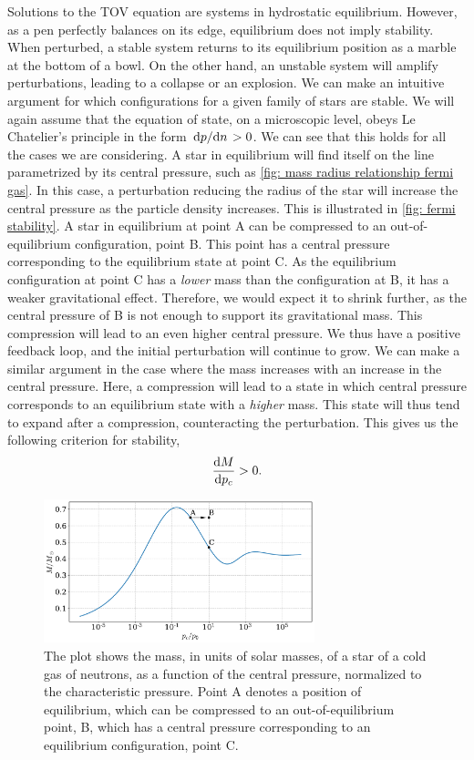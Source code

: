 Solutions to the TOV equation are systems in hydrostatic equilibrium.
However, as a pen perfectly balances on its edge, equilibrium does not imply stability.
When perturbed, a stable system returns to its equilibrium position as a marble at the bottom of a bowl.
On the other hand, an unstable system will amplify perturbations, leading to a collapse or an explosion.
We can make an intuitive argument for which configurations for a given family of stars are stable.
We will again assume that the equation of state, on a microscopic level, obeys Le Chatelier's principle in the form $\odv{p}/{n} > 0$.
We can see that this holds for all the cases we are considering.
A star in equilibrium will find itself on the line parametrized by its central pressure, such as \autoref{fig: mass radius relationship fermi gas}.
In this case, a perturbation reducing the radius of the star will increase the central pressure as the particle density increases.
This is illustrated in \autoref{fig: fermi stability}.
A star in equilibrium at point A can be compressed to an out-of-equilibrium configuration, point B.
This point has a central pressure corresponding to the equilibrium state at point C.
As the equilibrium configuration at point C has a \emph{lower} mass than the configuration at B, it has a weaker gravitational effect.
Therefore, we would expect it to shrink further, as the central pressure of B is not enough to support its gravitational mass.
This compression will lead to an even higher central pressure.
We thus have a positive feedback loop, and the initial perturbation will continue to grow.
We can make a similar argument in the case where the mass increases with an increase in the central pressure.
Here, a compression will lead to a state in which central pressure corresponds to an equilibrium state with a \emph{higher} mass.
This state will thus tend to expand after a compression, counteracting the perturbation.
This gives us the following criterion for stability,
%
\begin{equation}
    \odv{M}{p_c} > 0.
\end{equation}

\begin{figure}[!h]
    \centering
    \includegraphics[width=0.7\textwidth]{../scripts/figurer/fermi_stability.pdf}
    \caption{
        The plot shows the mass, in units of solar masses, of a star of a cold gas of neutrons, as a function of the central pressure, normalized to the characteristic pressure.
    Point A denotes a position of equilibrium, which can be compressed to an out-of-equilibrium point, B, which has a central pressure corresponding to an equilibrium configuration, point C.
    }
    \label{fig: fermi stability}
\end{figure}

